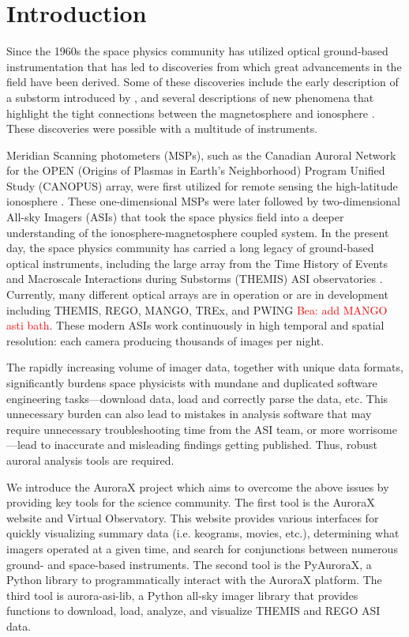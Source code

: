 \documentclass[utf8]{FrontiersinHarvard} %
\begin{document}
\section{Introduction}\label{intro}
Since the 1960s the space physics community has utilized optical ground-based instrumentation that has led to discoveries from which great advancements in the field have been derived. Some of these discoveries include the early description of a substorm introduced by \citet{Akasofu1964}, and several descriptions of new phenomena that highlight the tight connections between the magnetosphere and ionosphere \cite[e.g.][]{Angelopoulos2008, Jones2013, Shumko2021}. These discoveries were possible with a multitude of instruments. 

Meridian Scanning photometers (MSPs), such as the Canadian Auroral Network for the OPEN (Origins of Plasmas in Earth's Neighborhood) Program Unified Study (CANOPUS) array, were first utilized for remote sensing the high-latitude ionosphere \citep[e.g.][]{Rostoker1995}. These one-dimensional MSPs were later followed by two-dimensional All-sky Imagers (ASIs) that took the space physics field into a deeper understanding of the ionosphere-magnetosphere coupled system. In the present day, the space physics community has carried a long legacy of ground-based optical instruments, including the large array from the Time History of Events and Macroscale Interactions during Substorms (THEMIS) ASI observatories \citep{Donovan2006, Mende2009}. Currently, many different optical arrays are in operation or are in development including THEMIS, REGO, MANGO, TREx, and PWING  \citep[e.g.][]{Liang2016, Shiokawa2017, Lyons2019, Gillies2019} \textcolor{red}{Bea: add MANGO asti bath}. These modern ASIs work continuously in high temporal and spatial resolution: each camera producing thousands of images per night.

The rapidly increasing volume of imager data, together with unique data formats, significantly burdens space physicists with mundane and duplicated software engineering tasks---download data, load and correctly parse the data, etc. This unnecessary burden can also lead to mistakes in analysis software that may require unnecessary troubleshooting time from the ASI team, or more worrisome---lead to inaccurate and misleading findings getting published. Thus, robust auroral analysis tools are required.

We introduce the AuroraX project which aims to overcome the above issues by providing key tools for the science community. The first tool is the AuroraX website and Virtual Observatory. This website provides various interfaces for quickly visualizing summary data
(i.e. keograms, movies, etc.), determining what imagers operated at a given time, and search for conjunctions between numerous ground- and space-based instruments. The second tool is the PyAuroraX, a Python library to programmatically interact with the AuroraX platform. The third tool is aurora-asi-lib, a Python all-sky imager library that provides functions to download, load, analyze, and visualize THEMIS and REGO ASI data. 
\end{document}
